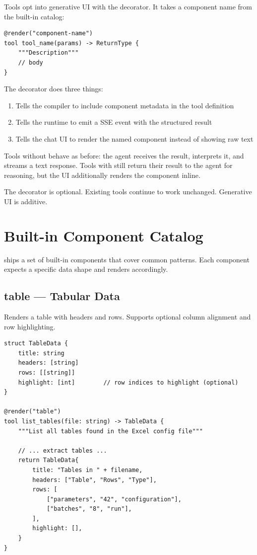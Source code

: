 Tools opt into generative UI with the  decorator. It takes a component name from the built-in catalog:

\begin{lstlisting}
@render("component-name")
tool tool_name(params) -> ReturnType {
    """Description"""
    // body
}
\end{lstlisting}

The decorator does three things:

\begin{enumerate}
    \item Tells the compiler to include component metadata in the tool definition
    \item Tells the runtime to emit a  SSE event with the structured result
    \item Tells the chat UI to render the named component instead of showing raw text
\end{enumerate}

Tools without  behave as before: the agent receives the result, interprets it, and streams a text response. Tools with  still return their result to the agent for reasoning, but the UI additionally renders the component inline.

\begin{note}
The  decorator is optional. Existing tools continue to work unchanged. Generative UI is additive.
\end{note}

\section{Built-in Component Catalog}

\haira{} ships a set of built-in components that cover common patterns. Each component expects a specific data shape and renders accordingly.

\subsection{table --- Tabular Data}

Renders a table with headers and rows. Supports optional column alignment and row highlighting.

\begin{lstlisting}
struct TableData {
    title: string
    headers: [string]
    rows: [[string]]
    highlight: [int]        // row indices to highlight (optional)
}

@render("table")
tool list_tables(file: string) -> TableData {
    """List all tables found in the Excel config file"""

    // ... extract tables ...
    return TableData{
        title: "Tables in " + filename,
        headers: ["Table", "Rows", "Type"],
        rows: [
            ["parameters", "42", "configuration"],
            ["batches", "8", "run"],
        ],
        highlight: [],
    }
}
\end{lstlisting}

